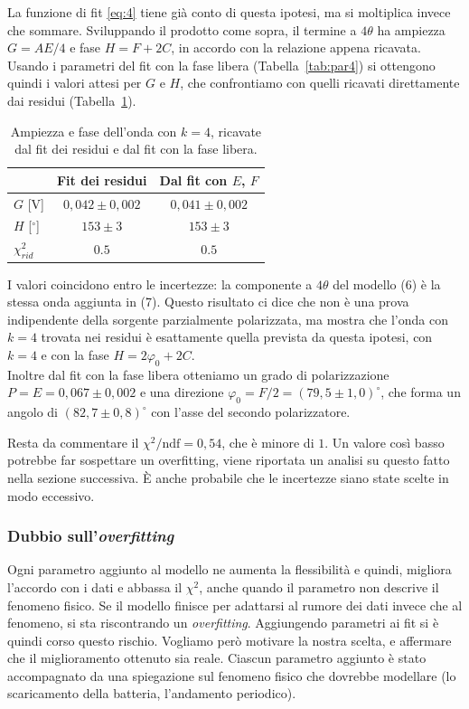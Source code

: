 \documentclass[10pt,twocolumn]{article}
\begin{document}
      La funzione di fit \ref{eq:4} tiene già conto di questa ipotesi, ma si moltiplica invece che sommare.
      Sviluppando il prodotto come sopra, il termine a $4\theta$ ha ampiezza $G = AE/4$ e fase $H = F + 2C$, in accordo con la relazione appena ricavata.
      Usando i parametri del fit con la fase libera (Tabella~\ref{tab:par4}) si ottengono quindi i valori attesi per $G$ e $H$, che confrontiamo con quelli ricavati direttamente dai residui (Tabella~\ref{tab:conf}).
      \begin{table}[H]
        \centering
        \small
        \begin{tabular}{lcc}
          \toprule
          & Fit dei residui & Dal fit con $E$, $F$ \\
          \midrule
          $G$ [V]               & $0{,}042 \pm 0{,}002$ & $0{,}041 \pm 0{,}002$ \\
          $H$ [$^\circ$]        & $153 \pm 3$     & $153 \pm 3$ \\
          $\chi_{rid}^2$ & $0.5$           & $0.5$ \\
          \bottomrule
        \end{tabular}
        \caption{Ampiezza e fase dell'onda con $k = 4$, ricavate dal fit dei residui e dal fit con la fase libera.}
        \label{tab:conf}
      \end{table}
      I valori coincidono entro le incertezze: la componente a $4\theta$ del modello (6) è la stessa onda aggiunta in (7). Questo risultato ci dice che non è una prova indipendente della sorgente parzialmente polarizzata,
      ma mostra che l'onda con $k = 4$ trovata nei residui è esattamente quella prevista da questa ipotesi, con $k = 4$ e con la fase $H = 2\varphi_0 + 2C$.
 \\
     Inoltre dal fit con la fase libera otteniamo un grado di polarizzazione $P = E = 0{,}067 \pm 0{,}002$ e una direzione $\varphi_0 = F/2 = (79{,}5 \pm 1{,}0)^\circ$,
      che forma un angolo di $(82{,}7 \pm 0{,}8)^\circ$ con l'asse del secondo polarizzatore.
      

      Resta da commentare il $\chi^2/\mathrm{ndf} = 0{,}54$, che è minore di $1$. Un valore così basso potrebbe far sospettare un overfitting, viene riportata un analisi su questo fatto nella sezione successiva.
      È anche probabile che le incertezze siano state scelte in modo eccessivo.
 

      \subsubsection{Dubbio sull'\emph{overfitting}}
      Ogni parametro aggiunto al modello ne aumenta la flessibilità e quindi, migliora l'accordo con i dati e abbassa il $\chi^2$, anche quando il parametro non descrive il fenomeno fisico.
      Se il modello finisce per adattarsi al rumore dei dati invece che al fenomeno, si sta riscontrando un \emph{overfitting}. Aggiungendo parametri ai fit si è quindi corso questo rischio.
      Vogliamo però motivare la nostra scelta, e affermare che il miglioramento ottenuto sia reale.
      Ciascun parametro aggiunto è stato accompagnato da una spiegazione sul fenomeno fisico che dovrebbe modellare (lo scaricamento della batteria, l'andamento periodico).
\end{document}
